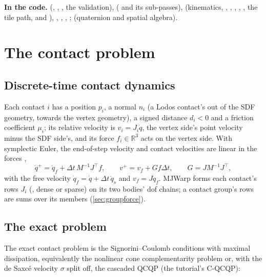 \begin{codebox}
\textbf{In the code.}  (, , , the validation),  ( and its sub-passes),  (kinematics, , , , , , the tile path,  and ), , , , ;  (quaternion and spatial algebra).
\end{codebox}

\section{The contact problem}\label{sec:problem}

\subsection{Discrete-time contact dynamics}\label{sec:discrete}

Each contact $i$ has a position $p_i$, a normal $n_i$ (a Lodos contact's out of the SDF geometry, towards the vertex geometry), a signed distance $d_i < 0$ and a friction coefficient $\mu_i$; its relative velocity is $v_i = J_i \dot q$, the vertex side's point velocity minus the SDF side's, and its force $f_i \in \mathbb R^3$ acts on the vertex side. With symplectic Euler, the end-of-step velocity and contact velocities are linear in the forces \cite{tutorial},
\begin{equation}\label{eq:vplus}
\dot q^+ = \dot q_f + \Delta t\, M^{-1} J^\top f, \qquad v^+ = v_f + G f \Delta t, \qquad G = J M^{-1} J^\top,
\end{equation}
with the free velocity $\dot q_f = \dot q + \Delta t\, \ddot q_s$ and $v_f = J \dot q_f$. MJWarp forms each contact's rows $J_i$ (, dense or sparse) on its two bodies' dof chains; a contact group's rows are sums over its members (\cref{sec:groupforce}).

\subsection{The exact problem}\label{sec:exact}

The exact contact problem is the Signorini--Coulomb conditions with maximal dissipation, equivalently the nonlinear cone complementarity problem \cite{desaxce} or, with the de Saxc\'e velocity $\sigma$ split off, the cascaded QCQP (the tutorial's C-QCQP):

